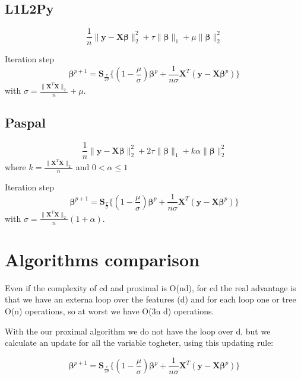 \documentclass[a4paper,10pt]{article}
\newcommand{\bbeta}{\boldsymbol{\beta}}
\newcommand{\X}{\mathbf{X}}
\newcommand{\y}{\mathbf{y}}
\begin{document}
\subsection{L1L2Py}
\begin{equation}
  \frac{1}{n} \| \y - \X \bbeta \|_2^2 
      + \tau \| \bbeta \|_1 + \mu \| \bbeta \|_2^2
\end{equation}

\noindent
Iteration step
\begin{equation}
    \bbeta^{p+1} = \mathbf{S}_{\frac{\tau}{2\sigma}}\{ 
                          (1 - \frac{\mu}{\sigma})\bbeta^p + 
                          \frac{1}{n\sigma}\X^T(\y - \X\bbeta^p)
                    \}
\end{equation}
with $\sigma = \frac{\|\X^T\X\|_2}{n} + \mu$.

\subsection{Paspal}
\begin{equation}
  \frac{1}{n} \| \y - \X \bbeta \|_2^2 
      + 2\tau \| \bbeta \|_1 + k\alpha \| \bbeta \|_2^2
\end{equation}
where $k = \frac{\|\X^T\X\|_2}{n}$ and $0 < \alpha \leq 1$

\noindent
Iteration step
\begin{equation}
    \bbeta^{p+1} = \mathbf{S}_{\frac{\tau}{\sigma}}\{ 
                          (1 - \frac{\mu}{\sigma})\bbeta^p + 
                          \frac{1}{n\sigma}\X^T(\y - \X\bbeta^p)
                    \}
\end{equation}
with $\sigma = \frac{\|\X^T\X\|_2}{n}(1 + \alpha)$.


\section{Algorithms comparison}
Even if the complexity of cd and proximal is O(nd), for cd the real
advantage is that we have an externa loop over the features (d) and
for each loop one or tree O(n) operations, so at worst we have O(3n d)
operations.

With the our proximal algorithm we do not have the loop over d, but
we calculate an update for all the variable togheter, using this updating
rule:

\begin{equation}
    \bbeta^{p+1} = \mathbf{S}_{\frac{\tau}{2\sigma}}\{ 
                          (1 - \frac{\mu}{\sigma})\bbeta^p + 
                          \frac{1}{n\sigma}\X^T(\y - \X\bbeta^p)
                    \}
\end{equation}
\end{document}
